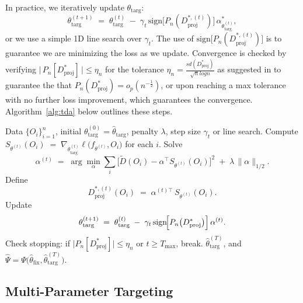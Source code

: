 \documentclass{article}
\theoremstyle{remark}
\begin{document}
In practice, we iteratively update $\theta_{\text{targ}}$:
\[
  \theta_{\text{targ}}^{(t+1)} 
  \;=\;
  \theta_{\text{targ}}^{(t)} 
  \;-\;\gamma_t\,\text{sign}\bigl[P_n(D^{*,(t)}_{\mathrm{proj}})\bigr]\,
          \alpha^*_{\theta_{\text{targ}}^{(t)}},
\]
or we use a simple 1D line search over $\gamma_t$. The use of $\text{sign}\bigl[P_n(D^{*,(t)}_{\mathrm{proj}})\bigr]$ is to guarantee we are minimizing the loss as we update. Convergence is checked by verifying 
\(
  \bigl|\,P_n[D^*_{\mathrm{proj}}]\,\bigr|\le\eta_n
\)
for the tolerance $\eta_n=\frac{sd(D^*_{\mathrm{proj}})}{\sqrt{n}logn}$ as suggested in \cite{rytgaard2024one} to guarantee the that $P_n(D^*_{\mathrm{proj}})=o_p(n^{-\frac{1}{2}})$, or upon reaching a max tolerance with no further loss improvement, which guarantees the convergence. Algorithm~\ref{alg:tda} below outlines these steps.


\begin{algorithm}[t!]
\caption{TDA Procedure (Projection-Based EIF Approximation)}
\label{alg:tda}
\begin{algorithmic}[1]
   Data $\{O_i\}_{i=1}^n$, initial $\theta_{\text{targ}}^{(0)}=\hat{\theta}_{\text{targ}}$, penalty $\lambda$, step size $\gamma_t$ or line search.
     \STATE Compute $S_{\theta^{(t)}}(O_i) \;=\; \nabla_{\theta_{\text{targ}}^{(t)}}\ell\bigl(f_{\theta^{(t)}},O_i\bigr)$ for each $i$.
     \STATE Solve 
     \[
       \alpha^{(t)} \;=\; 
         \arg\min_{\alpha}\sum_i \bigl[\widetilde{D}(O_i) - \alpha^\top S_{\theta^{(t)}}(O_i)\bigr]^2 
         \;+\;\lambda\,\|\alpha\|_{1/\!2}.
     \]
     \STATE Define 
     \[
       D^{*,(t)}_{\mathrm{proj}}(O_i) 
       \;=\; 
       \alpha^{(t)\top}\,S_{\theta^{(t)}}(O_i).
     \]
     \STATE Update 
     \[
       \theta_{\text{targ}}^{(t+1)} 
         \;=\; 
         \theta_{\text{targ}}^{(t)} 
         \;-\;
         \gamma_t\,\text{sign}\!\Bigl[P_n\bigl(D^*_{\mathrm{proj}}\bigr)\Bigr]\,
                   \alpha^{(t)}.
     \]
     \STATE Check stopping: if $\bigl|P_n[D^*_{\mathrm{proj}}]\bigr|\le\eta_n$ or $t\!\ge\!T_{\max}$, break.
  \ENDFOR
   $\widehat{\theta}_{\text{targ}}^{(T)}$, and $\widehat{\Psi}=\Psi\bigl(\hat{\theta}_{\text{fix}},\widehat{\theta}_{\text{targ}}^{(T)}\bigr)$.
\end{algorithmic}
\end{algorithm}

\subsection{Multi-Parameter Targeting}
\label{sec:method:multi}
\end{document}
